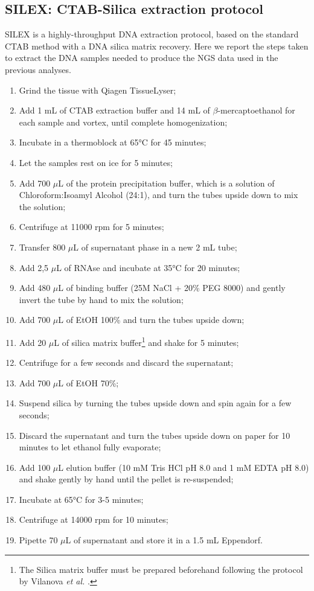 \documentclass[a4paper, 12pt]{report}
\begin{document}
\subsection{SILEX: CTAB-Silica extraction protocol}
\vspace{-1em}
SILEX is a highly-throughput DNA extraction protocol, based on the standard CTAB method with a DNA silica matrix recovery. Here we report the steps taken to extract the DNA samples needed to produce the NGS data used in the previous analyses. \parencite{vilanovaSILEXFastInexpensive2020}
\vspace{-1em}
\begin{enumerate}\setlength\itemsep{-0.2em}
\item Grind the tissue with Qiagen TissueLyser;
\item Add 1 mL of CTAB extraction buffer and 14 mL of $\beta$-mercaptoethanol for each sample and vortex, until complete homogenization;
\item Incubate in a thermoblock at 65°C for 45 minutes;
\item Let the samples rest on ice for 5 minutes;
\item Add 700 $\mu$L of the protein precipitation buffer, which is a solution of Chloroform:Isoamyl Alcohol (24:1), and turn the tubes upside down to mix the solution;
\item Centrifuge at 11000 rpm for 5 minutes;
\item Transfer 800 $\mu$L of supernatant phase in a new 2 mL tube;
\item Add 2,5 $\mu$L of RNAse and incubate at 35°C for 20 minutes;
\item Add 480 $\mu$L of binding buffer (25M NaCl + 20\% PEG 8000) and gently invert the tube by hand to mix the solution;
\item Add 700 $\mu$L of EtOH 100\% and turn the tubes upside down;
\item Add 20 $\mu$L of silica matrix buffer\footnote{The Silica matrix buffer must be prepared beforehand following the protocol by Vilanova \textit{et al.} \parencite{vilanovaSILEXFastInexpensive2020}.} and shake for 5 minutes;
\item Centrifuge for a few seconds and discard the supernatant;
\item Add 700 $\mu$L of EtOH 70\%;
\item Suspend silica by turning the tubes upside down and spin again for a few seconds;
\item Discard the supernatant and turn the tubes upside down on paper for 10 minutes to let ethanol fully evaporate;
\item Add 100 $\mu$L elution buffer (10 mM Tris HCl pH 8.0 and 1 mM EDTA pH 8.0) and shake gently by hand until the pellet is re-suspended;
\item Incubate at 65°C for 3-5 minutes;
\item Centrifuge at 14000 rpm for 10 minutes;
\item Pipette 70 $\mu$L of supernatant and store it in a 1.5 mL Eppendorf.
\end{enumerate}
\end{document}
